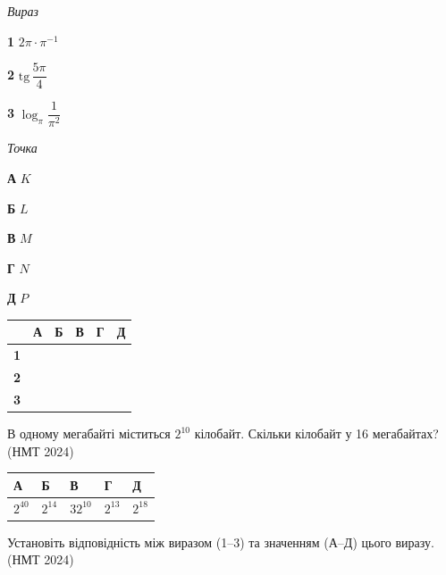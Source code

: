 \documentclass[14pt]{extarticle}
\newcommand{\answerTable}[5]{
\begin{center}
\begin{tabular}{|*{5}{>{\centering\arraybackslash}m{2.8cm}|}}
\hline
\rule[-0.3cm]{0pt}{0.8cm}\textbf{А} & \textbf{Б} & \textbf{В} & \textbf{Г} & \textbf{Д} \\
\hline
\rule[-0.4cm]{0pt}{1.0cm}#1 & \rule[-0.4cm]{0pt}{1.0cm}#2 & \rule[-0.4cm]{0pt}{1.0cm}#3 & \rule[-0.4cm]{0pt}{1.0cm}#4 & \rule[-0.4cm]{0pt}{1.0cm}#5 \\
\hline
\end{tabular}
\end{center}
}
\newcommand{\matchTable}{
\begin{tabular}{|>{\centering\arraybackslash}p{0.2cm}|*{5}{>{\centering\arraybackslash}p{0.2cm}|}}
\hline
& \textbf{А} & \textbf{Б} & \textbf{В} & \textbf{Г} & \textbf{Д} \\
\hline
\textbf{1} & \rule{0pt}{0.2cm} & & & & \\
\hline
\textbf{2} & \rule{0pt}{0.2cm} & & & & \\
\hline
\textbf{3} & \rule{0pt}{0.2cm} & & & & \\
\hline
\end{tabular}
}
\newcommand{\task}[2]{\noindent\makebox[1.5em][l]{\textbf{#1.}}\parbox[t]{\dimexpr\textwidth-1.5em}{#2}}
\newcommand{\nmtyear}[1]{\hfill{\small\color{yearcolor}(НМТ #1)}}
\begin{document}
\vspace{0.3cm}
\begin{minipage}{0.35\textwidth}
\textit{Вираз}

\vspace{0.2cm}
\textbf{1} \quad $2\pi \cdot \pi^{-1}$

\vspace{0.2cm}
\textbf{2} \quad $\mathrm{tg}\,\dfrac{5\pi}{4}$

\vspace{0.3cm}
\textbf{3} \quad $\log_\pi \dfrac{1}{\pi^2}$
\end{minipage}
\hfill
\begin{minipage}{0.35\textwidth}
\textit{Точка}

\vspace{0.2cm}
\textbf{А} \quad $K$

\vspace{0.2cm}
\textbf{Б} \quad $L$

\vspace{0.2cm}
\textbf{В} \quad $M$

\vspace{0.2cm}
\textbf{Г} \quad $N$

\vspace{0.2cm}
\textbf{Д} \quad $P$
\end{minipage}
\hfill
\begin{minipage}{0.2\textwidth}
\matchTable
\end{minipage}

\vspace{0.7cm}

\task{20}{В одному мегабайті міститься $2^{10}$ кілобайт. Скільки кілобайт у 16 мегабайтах? \nmtyear{2024}}
\answerTable{$2^{40}$}{$2^{14}$}{$32^{10}$}{$2^{13}$}{$2^{18}$}

\vspace{0.5cm}

\task{21}{Установіть відповідність між виразом (1--3) та значенням (А--Д) цього виразу. \nmtyear{2024}}
\end{document}
